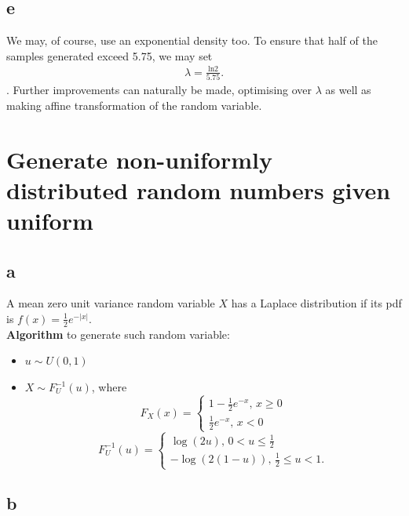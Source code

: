 \documentclass[a4paper,11pt]{article}
\begin{document}
\subsection*{e}
We may, of course, use an exponential density too.
To ensure that half of the samples generated exceed 5.75, we
may set
\begin{align}
\lambda = \frac{\mathrm{ln} 2}{5.75}.
\end{align}.
Further improvements can naturally be made, optimising over $\lambda$ as well
as making affine transformation of the random variable.

\section*{Generate non-uniformly distributed random numbers given uniform}

\subsection*{a}

A mean zero unit variance random variable $X$ has a Laplace distribution if its pdf is $f(x) = \frac{1}{2}  e^{-|x|}$.\\
\textbf{Algorithm} to generate such random variable:
\vspace{0.02in}
\begin{itemize}
\item $u \sim U(0,1)$
\item $ X \sim F_{U}^{-1}(u)$, where 
\begin{equation*}
 F_{X}(x) =
  \begin{cases}
   1 - \frac{1}{2} e^{-x},\, x \geq 0 \\
   \frac{1}{2} e^{-x},\,    x < 0
  \end{cases}
\end{equation*}
\begin{equation*}
 F^{-1}_{U}(u) =
  \begin{cases}
   \log{(2u)}, \,     0< u \leq \frac{1}{2} \\
   -\log{(2(1-u))} ,  \,  \frac{1}{2} \leq u < 1.
  \end{cases}
\end{equation*}
\end{itemize}

\subsection*{b}
\end{document}
